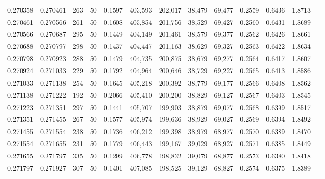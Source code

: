 \begin{tabular}{rrrrrrrrrrrrr}
0.270358 & 0.270461 &   263 &  50 &                                     0.1597 & 403,593 & 202,017 &  38,479 &  69,477 & 0.2559 & 0.6436 & 1.8713 \\
0.270461 & 0.270566 &   261 &  50 &                                     0.1608 & 403,854 & 201,756 &  38,529 &  69,427 & 0.2560 & 0.6431 & 1.8689 \\
0.270566 & 0.270687 &   295 &  50 &                                     0.1449 & 404,149 & 201,461 &  38,579 &  69,377 & 0.2562 & 0.6426 & 1.8661 \\
0.270688 & 0.270797 &   298 &  50 &                                     0.1437 & 404,447 & 201,163 &  38,629 &  69,327 & 0.2563 & 0.6422 & 1.8634 \\
0.270798 & 0.270923 &   288 &  50 &                                     0.1479 & 404,735 & 200,875 &  38,679 &  69,277 & 0.2564 & 0.6417 & 1.8607 \\
0.270924 & 0.271033 &   229 &  50 &                                     0.1792 & 404,964 & 200,646 &  38,729 &  69,227 & 0.2565 & 0.6413 & 1.8586 \\
0.271033 & 0.271138 &   254 &  50 &                                     0.1645 & 405,218 & 200,392 &  38,779 &  69,177 & 0.2566 & 0.6408 & 1.8562 \\
0.271138 & 0.271222 &   192 &  50 &                                     0.2066 & 405,410 & 200,200 &  38,829 &  69,127 & 0.2567 & 0.6403 & 1.8545 \\
0.271223 & 0.271351 &   297 &  50 &                                     0.1441 & 405,707 & 199,903 &  38,879 &  69,077 & 0.2568 & 0.6399 & 1.8517 \\
0.271351 & 0.271455 &   267 &  50 &                                     0.1577 & 405,974 & 199,636 &  38,929 &  69,027 & 0.2569 & 0.6394 & 1.8492 \\
0.271455 & 0.271554 &   238 &  50 &                                     0.1736 & 406,212 & 199,398 &  38,979 &  68,977 & 0.2570 & 0.6389 & 1.8470 \\
0.271554 & 0.271655 &   231 &  50 &                                     0.1779 & 406,443 & 199,167 &  39,029 &  68,927 & 0.2571 & 0.6385 & 1.8449 \\
0.271655 & 0.271797 &   335 &  50 &                                     0.1299 & 406,778 & 198,832 &  39,079 &  68,877 & 0.2573 & 0.6380 & 1.8418 \\
0.271797 & 0.271927 &   307 &  50 &                                     0.1401 & 407,085 & 198,525 &  39,129 &  68,827 & 0.2574 & 0.6375 & 1.8389 \\

\end{tabular}
